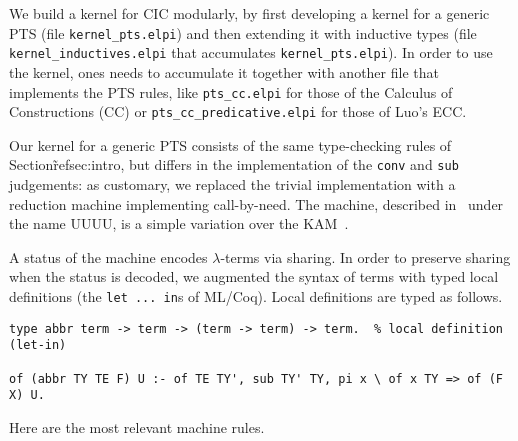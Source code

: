 We build a kernel for CIC modularly, by first developing a kernel for a generic PTS (file \verb+kernel_pts.elpi+) and then extending it with inductive types (file \verb+kernel_inductives.elpi+ that accumulates \verb+kernel_pts.elpi+). In order to use the kernel, ones needs to accumulate it together with another file that implements the PTS rules, like \verb+pts_cc.elpi+ for those of the Calculus of Constructions (CC) or \verb+pts_cc_predicative.elpi+ for those of Luo's ECC.

Our kernel for a generic PTS consists of the same type-checking rules of Section\~ref{sec:intro}, but differs in the implementation of the \verb+conv+ and \verb+sub+ judgements: as customary, we replaced the trivial implementation with a reduction machine implementing call-by-need. The machine, described in~\cite{beniamino} under the name UUUU, is a simple variation over the KAM~\cite{XXX}.

A status of the machine encodes $\lambda$-terms via sharing. In order to preserve sharing when the status is decoded, we augmented the syntax of terms with typed local definitions (the \verb+let ... in+s of ML/Coq). Local definitions are typed as follows.

\begin{verbatim}
type abbr term -> term -> (term -> term) -> term.  % local definition (let-in)

of (abbr TY TE F) U :- of TE TY', sub TY' TY, pi x \ of x TY => of (F X) U.
\end{verbatim}

Here are the most relevant machine rules.

